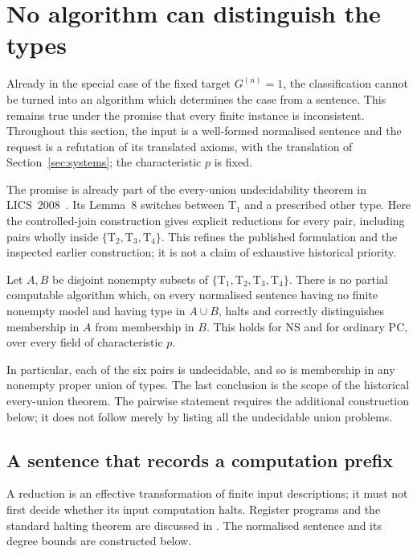 \section{No algorithm can distinguish the types}\label{sec:undecidability}
Already in the special case of the fixed target $G^{(n)}=1$, the
classification cannot be turned into an algorithm
which determines the case from a sentence. This remains true under the
promise that every finite instance is inconsistent. Throughout this section,
the input is a well-formed normalised sentence and the request is a
refutation of its translated axioms, with the translation of
Section~\ref{sec:systems}; the characteristic $p$ is fixed.

The promise is already part of the every-union undecidability theorem
in LICS~2008~\cite[Theorem~1]{Riis}. Its Lemma~8 switches between
$\mathrm T_1$ and a prescribed other type. Here the controlled-join
construction gives explicit reductions for every pair, including
pairs wholly inside $\{\mathrm T_2,\mathrm T_3,\mathrm T_4\}$.
This refines the published formulation and the inspected earlier
construction; it is not a claim of exhaustive historical priority.

\begin{theorem}\label{thm:undecidability}
Let $A,B$ be disjoint nonempty subsets of $\{\mathrm T_1,\mathrm T_2,
\mathrm T_3,\mathrm T_4\}$. There is no partial computable algorithm which,
on every normalised sentence having no finite nonempty model and having
type in $A\cup B$, halts and correctly distinguishes membership in $A$
from membership in $B$. This holds for NS and for ordinary PC, over every
field of characteristic $p$.
\end{theorem}

In particular, each of the six pairs is undecidable, and so is membership
in any nonempty proper union of types. The last conclusion is the scope
of the historical every-union theorem. The pairwise statement requires the
additional construction below; it does not follow merely by listing all
the undecidable union problems.

\subsection{A sentence that records a computation prefix}
A reduction is an effective transformation of finite input descriptions;
it must not first decide whether its input computation halts. Register
programs and the standard halting theorem are discussed in \cite{Cutland}.
The normalised sentence and its degree bounds are constructed below.

